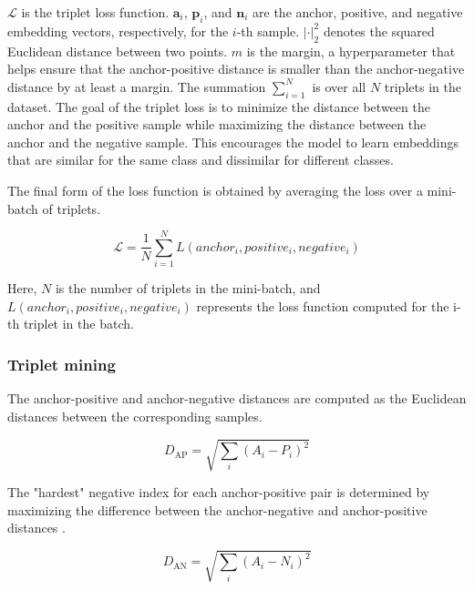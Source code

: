 $\mathcal{L}$ is the triplet loss function.
$\mathbf{a}_i$, $\mathbf{p}_i$, and $\mathbf{n}_i$ are the anchor, positive, and negative embedding vectors, respectively, for the $i$-th sample.
$\left| \cdot \right|_2^2$ denotes the squared Euclidean distance between two points.
$m$ is the margin, a hyperparameter that helps ensure that the anchor-positive distance is smaller than the anchor-negative distance by at least a margin.
The summation $\sum_{i=1}^{N}$ is over all $N$ triplets in the dataset.
The goal of the triplet loss is to minimize the distance between the anchor and the positive sample while maximizing the distance between the anchor and the negative sample. This encourages the model to learn embeddings that are similar for the same class and dissimilar for different classes.

The final form of the loss function is obtained by averaging the loss over a mini-batch of triplets. 

\begin{equation}
\mathcal{L} = \frac{1}{N} \sum_{i=1}^{N} L(anchor_i, positive_i, negative_i)
\end{equation}

Here, $N$ is the number of triplets in the mini-batch, and $L(anchor_i, positive_i, negative_i)$ represents the loss function computed for the i-th triplet in the batch.

\subsubsection{Triplet mining}

The anchor-positive and anchor-negative distances are computed as the Euclidean distances between the corresponding samples.

\begin{equation}
D_{\text{AP}} = \sqrt{\sum_{i} (A_i - P_i)^2}
\end{equation}

The "hardest" negative index for each anchor-positive pair is determined by maximizing the difference between the anchor-negative and anchor-positive distances \cite{XuanImprovedMining}.

\begin{equation}
D_{\text{AN}} = \sqrt{\sum_{i} (A_i - N_i)^2}
\end{equation}
